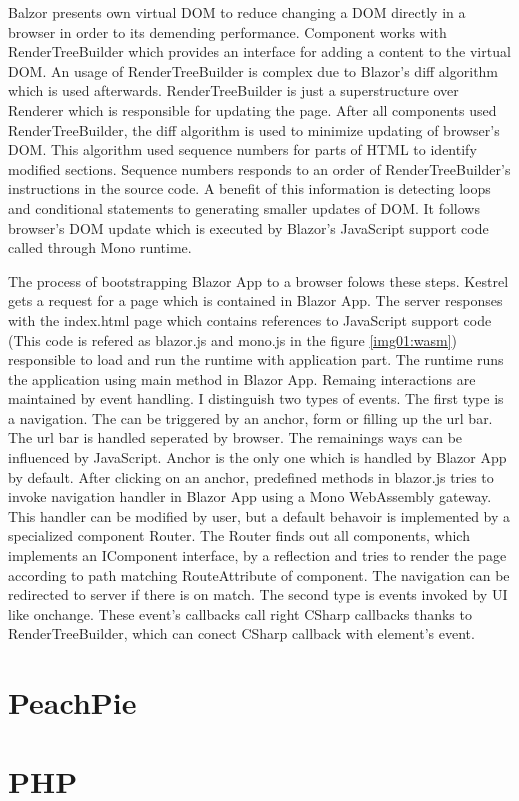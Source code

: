 Balzor presents own virtual DOM to reduce changing a DOM directly in a browser in order to its demending performance.
Component works with RenderTreeBuilder which provides an interface for adding a content to the virtual DOM.
An usage of RenderTreeBuilder is complex due to Blazor's diff algorithm which is used afterwards.
RenderTreeBuilder is just a superstructure over Renderer which is responsible for updating the page.
After all components used RenderTreeBuilder, the diff algorithm is used to minimize updating of browser's DOM.
This algorithm used sequence numbers for parts of HTML to identify modified sections.
Sequence numbers responds to an order of RenderTreeBuilder's instructions in the source code.
A benefit of this information is detecting loops and conditional statements to generating smaller updates of DOM.  
It follows browser's DOM update which is executed by Blazor's JavaScript support code called through Mono runtime.

The process of bootstrapping Blazor App to a browser folows these steps. 
Kestrel gets a request for a page which is contained in Blazor App. 
The server responses with the index.html page which contains references to JavaScript support code (This code is refered as blazor.js and mono.js in the figure \ref{img01:wasm}) responsible to load and run the runtime with application part.
The runtime runs the application using main method in Blazor App.
Remaing interactions are maintained by event handling.
I distinguish two types of events.
The first type is a navigation.
The \cite{navigation} can be triggered by an anchor, form or filling up the url bar.
The url bar is handled seperated by browser.
The remainings ways can be influenced by JavaScript.
Anchor is the only one which is handled by Blazor App by default.
After clicking on an anchor, predefined methods in blazor.js tries to invoke navigation handler in Blazor App using a Mono WebAssembly gateway.
This handler can be modified by user, but a default behavoir is implemented by a specialized component Router.
The Router finds out all components, which implements an IComponent interface, by a reflection and tries to render the page according to path matching RouteAttribute of component.
The navigation can be redirected to server if there is on match.
The second type is events invoked by UI like onchange. These event's callbacks call right CSharp callbacks thanks to RenderTreeBuilder, which can conect CSharp callback with element's event.

\section{PeachPie}


\section{PHP}

